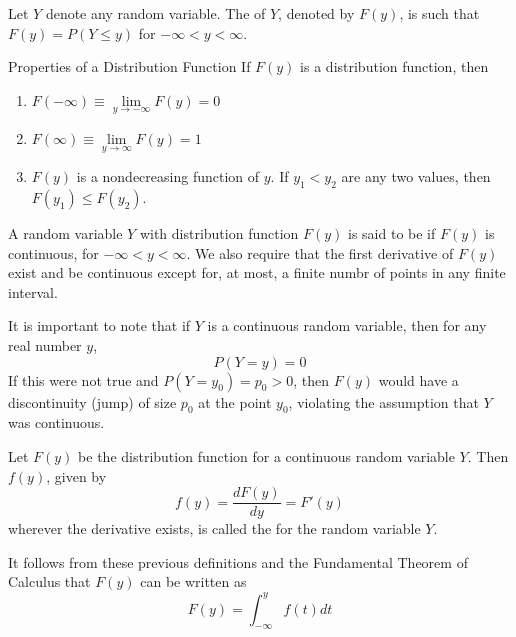 \documentclass[12pt, a4paper, twoside, openright, titlepage]{book}
\begin{document}
\begin{defn}{}{}
    Let $Y$ denote any random variable. The  of $Y$, denoted by $F(y)$, is such that $F(y) = P(Y\leq y)$ for $-\infty < y < \infty$.
\end{defn}


\begin{thm}{Properties of a Distribution Function} 
    If $F(y)$ is a distribution function, then \begin{enumerate}
        \item $F(-\infty) \equiv \lim\limits_{y\rightarrow -\infty}F(y) = 0$
        \item $F(\infty) \equiv \lim\limits_{y\rightarrow \infty}F(y) = 1$
        \item $F(y)$ is a nondecreasing function of $y$. If $y_1 < y_2$ are any two values, then $F(y_1)\leq F(y_2)$.
    \end{enumerate}
\end{thm}

\begin{defn}{}{}
    A random variable $Y$ with distribution function $F(y)$ is said to be  if $F(y)$ is continuous, for $-\infty < y < \infty$. We also require that the first derivative of $F(y)$ exist and be continuous except for, at most, a finite numbr of points in any finite interval. 
\end{defn}


It is important to note that if $Y$ is a continuous random variable, then for any real number $y$, \begin{equation*}
    P(Y = y) = 0
\end{equation*}
If this were not true and $P(Y = y_0) = p_0 > 0$, then $F(y)$ would have a discontinuity (jump) of size $p_0$ at the point $y_0$, violating the assumption that $Y$ was continuous.

\begin{defn}{}{}
    Let $F(y)$ be the distribution function for a continuous random variable $Y$. Then $f(y)$, given by \begin{equation*}
        f(y) = \frac{dF(y)}{dy} = F'(y)
    \end{equation*}
    wherever the derivative exists, is called the  for the random variable $Y$.
\end{defn}

It follows from these previous definitions and the Fundamental Theorem of Calculus that $F(y)$ can be written as \begin{equation*}
    F(y) = \int_{-\infty}^y f(t)dt
\end{equation*}
\end{document}
